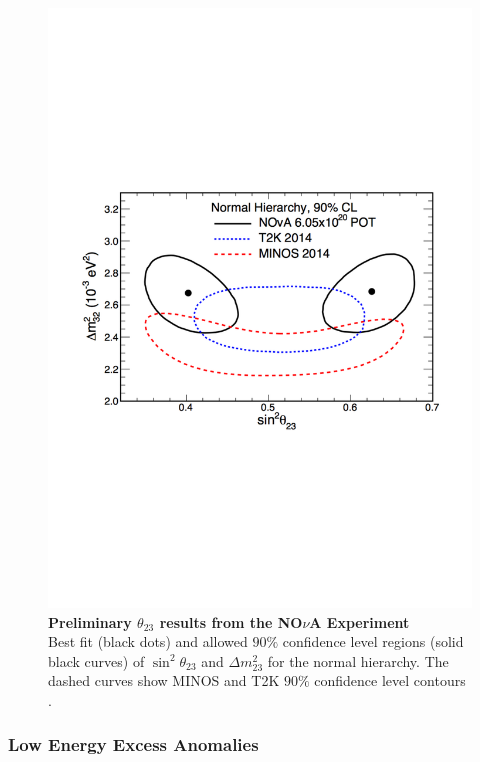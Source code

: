 \begin{figure}
	\begin{center}
		\includegraphics[scale=0.7]{Figures/nova_result.pdf}
		\caption[Preliminary $\theta_{23}$ results from the NO$\nu$A Experiment]{ {\textbf{Preliminary $\theta_{23}$ results from the NO$\nu$A Experiment}} \\ Best fit (black dots) and allowed $90\%$ confidence level regions (solid black curves) of $\sin^2 \theta_{23}$ and $\Delta m^2_{23}$ for the normal hierarchy. The dashed curves show MINOS \cite{MINOS} and T2K \cite{T2K} $90\%$ confidence level contours \cite{NOVA}.}
		\label{nova_result}	
	\end{center}
\end{figure} 


\subsubsection{Low Energy Excess Anomalies}

